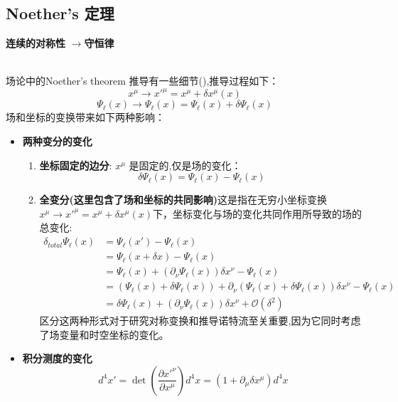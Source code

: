 
\subsection{Noether's 定理}
\begin{tcolorbox}[colback=white!5,colframe=black!45]
          \centering
      \textbf{连续的对称性} 
      \(\longrightarrow \)\textbf{守恒律}
\end{tcolorbox}
\noindent
\\
场论中的Noether's theorem 推导有一些细节(),推导过程如下：
\medskip
        $$
        x^\mu \rightarrow x'^\mu = x^\mu + \delta x^\mu(x)
        $$
        $$
        \Psi_\ell(x) \rightarrow \Psi_\ell (x) = \Psi_\ell(x) + \delta \Psi_\ell(x)
        $$
\noindent
场和坐标的变换带来如下两种影响：
\begin{itemize}
  \item \textbf{两种变分的变化}\\
            \begin{enumerate}
              \item \textbf{坐标固定的边分}:
                \(x^\mu\) 是固定的,仅是场的变化：
                \[\delta\Psi_\ell(x)=\Psi_\ell (x) - \Psi_\ell(x)\]
              \item \textbf{全变分(这里包含了场和坐标的共同影响)}这是指在无穷小坐标变换 
                \(x^\mu \rightarrow x'^\mu = x^\mu + \delta x^\mu(x)\)下，坐标变化与场的变化共同作用所导致的场的总变化:
                    \begin{align*}
                \delta_{total} \Psi_\ell(x)&= \Psi_\ell (x') - \Psi_\ell(x) \\
                &= \Psi_\ell (x + \delta x) - \Psi_\ell(x) \\
                &= \Psi_\ell (x) + \left(\partial_\nu \Psi_\ell (x)\right) \delta x^\nu - \Psi_\ell(x) \\
                &= \left(\Psi_\ell(x) + \delta \Psi_\ell(x)\right) + \partial_\nu \left(\Psi_\ell(x) + \delta \Psi_\ell(x)\right) \delta x^\nu - \Psi_\ell(x) \\
                &= \delta \Psi_\ell(x) + \left(\partial_\nu \Psi_\ell(x) \right)\delta  x^\nu+ \mathscr{O}(\delta^2)
                \end{align*}
                区分这两种形式对于研究对称变换和推导诺特流至关重要,因为它同时考虑了场变量和时空坐标的变化。
            \end{enumerate}
  \item \textbf{积分测度的变化}
      \[
      d^4 x' = \det\left(\frac{\partial x'^\nu}{\partial x^\mu}\right) d^4 x = (1 + \partial_\mu \delta x^\mu) d^4 x 
      \]
\end{itemize}

